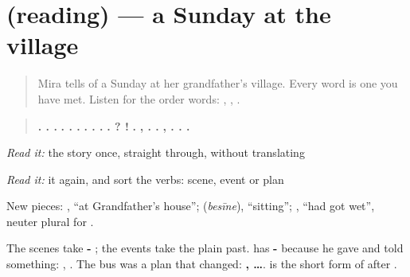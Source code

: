 \section[(reading)]{(reading) — a Sunday at the village}

\label{lesson:GU-C276-ek-ravivar}



\begin{quote}
Mira tells of a Sunday at her grandfather's village. Every word is one you have met. Listen for the order words: \textbf{}, \textbf{ }, \textbf{}.
\end{quote}

\begin{tcolorbox}[breakable,skin=enhanced,colback=orange!6,colframe=orange!45!black,boxrule=0.5pt,arc=1mm,left=6pt,right=6pt,top=4pt,bottom=4pt,fonttitle=\bfseries,title={Read this}]
\begin{quote}
\textbf{  .     .    .} \textbf{    .      .     .} \textbf{    .    .        .} \textbf{   .  ?      !} \textbf{       .} \textbf{      ,    .     .} \textbf{  ,    .      .   .}
\end{quote}

\emph{Read it:} the story once, straight through, without translating

\emph{Read it:} it again, and sort the verbs: scene, event or plan
\end{tcolorbox}

\begin{culture}
New pieces: \textbf{ }, \textquotedblleft{}at Grandfather's house\textquotedblright{}; \textbf{} (\emph{besīne}), \textquotedblleft{}sitting\textquotedblright{}; \textbf{   }, \textquotedblleft{}had got wet\textquotedblright{}, neuter plural for \textbf{}.

The scenes take \textbf{- }; the events take the plain past. \textbf{} has \textbf{-} because he gave and told something: \textbf{ }, \textbf{ }. The bus was a plan that changed: \textbf{ ,  …}. \textbf{ } is the short form of \textbf{} after \textbf{}.
\end{culture}


